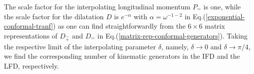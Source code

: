 \documentclass[%
 reprint,
superscriptaddress,
 amsmath,amssymb,
 aps,
]{revtex4-2}
\begin{document}
The scale factor for the interpolating longitudinal momentum $P_{\hat{-}}$ is one, while the scale factor for the dilatation $D$ is $e^{-\alpha}$ with $\alpha=\omega^{-1-2}$ in Eq.(\ref{exponential-conformal-tranf}) as one can find straightforwardly from the $6\times6$ matrix representations of $D_{\hat{+}}$ and $D_{\hat{-}}$ in Eq.(\ref{matrix-rep-conformal-generators}). 
Taking the respective limit of the interpolating parameter $\delta$, namely,  
$\delta \to 0$ and $\delta \to \pi/4$, we find the corresponding number of kinematic generators in the IFD and the LFD, respectively. 
%
\begin{widetext}
\begin{center}
\begin{table}[h!]
\end{table}
\end{center}
\end{widetext}
\end{document}
